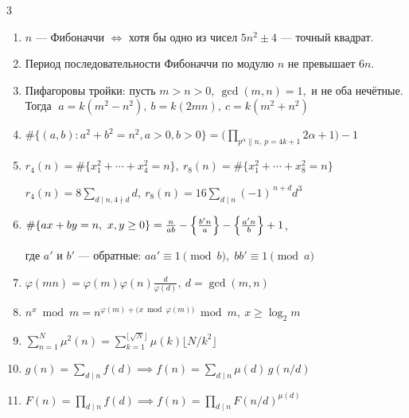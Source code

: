 \documentclass[8pt,a4paper,landscape,twosided]{extarticle}
\begin{document}
\begin{multicols*}{3}
\begin{enumerate}
\item %
$n$ — Фибоначчи $\iff$ хотя бы одно из чисел $5n^2\pm4$ — точный квадрат.

\item %
Период последовательности Фибоначчи по модулю $n$ не превышает $6n$.

\item %
Пифагоровы тройки: пусть $m>n>0,\ \gcd(m,n)=1,$ и не оба нечётные. Тогда
$\;a=k(m^2-n^2),\ b=k(2mn),\ c=k(m^2+n^2)$


\item %
$\displaystyle \#\{(a,b):a^2+b^2=n^2,a>0,b>0\}
=\Big(\prod_{p^\alpha\parallel n,\ p = 4k+1}2\alpha+1\Big)-1$

\item %
$r_4(n)=\#\{x_1^2+\cdots+x_4^2=n\},\ 
r_8(n)=\#\{x_1^2+\cdots+x_8^2=n\}$

$r_4(n)=8\sum_{d\mid n, 4\nmid d}d,\ 
r_8(n)=16\sum_{d\mid n}(-1)^{\,n+d}d^3$

\item %
$\#\{ax+by=n,\ x,y\ge0\}=\frac{n}{ab}-\Bigl\{\tfrac{b'n}{a}\Bigr\}-\Bigl\{\tfrac{a'n}{b}\Bigr\}+1$,

где $a'$ и $b'$ — обратные: $aa'\equiv1\pmod b,\; bb'\equiv1\pmod a$

\item %
$\varphi(mn)=\varphi(m)\varphi(n)\frac{d}{\varphi(d)},\  d=\gcd(m,n)$

\item %
$n^x\bmod m = n^{\varphi(m)+\bigl(x\bmod\varphi(m)\bigr)}\bmod m,\ x\ge\log_2 m$

\item %
$\sum_{n=1}^N\mu^2(n)=\sum_{k=1}^{\lfloor\sqrt N\rfloor}\mu(k)\bigl\lfloor N/k^2\bigr\rfloor$

\item %
$g(n)=\sum_{d\mid n}f(d) \implies f(n)=\sum_{d\mid n}\mu(d)\,g(n/d)$

\item %
$F(n)=\prod_{d\mid n}f(d) \implies f(n)=\prod_{d\mid n}F(n/d)^{\mu(d)}$


\end{enumerate}
\end{multicols*}
\end{document}
